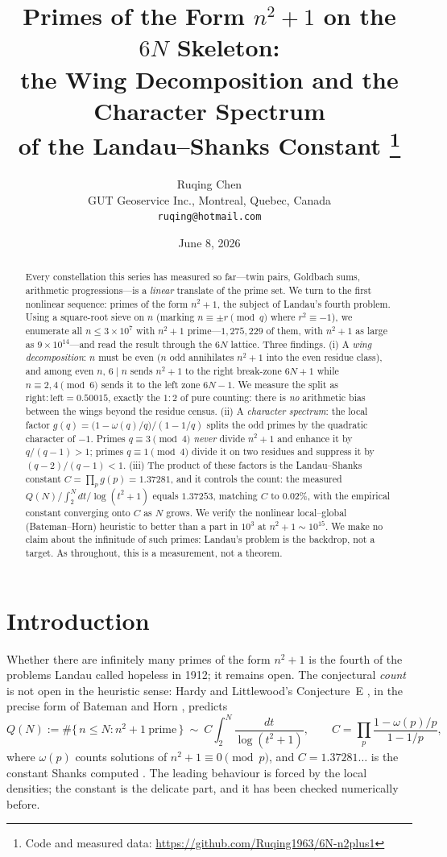 \documentclass[11pt]{article}
\title{\bf Primes of the Form $n^2+1$ on the $6N$ Skeleton:\\
the Wing Decomposition and the Character Spectrum\\
of the Landau--Shanks Constant%
\thanks{Code and measured data: \url{https://github.com/Ruqing1963/6N-n2plus1}}}
\author{Ruqing Chen\\
\small GUT Geoservice Inc., Montreal, Quebec, Canada\\
\small \texttt{ruqing@hotmail.com}}
\date{June 8, 2026}
\theoremstyle{definition}
\begin{document}
\maketitle

\begin{abstract}
Every constellation this series has measured so far---twin pairs, Goldbach sums, arithmetic
progressions---is a \emph{linear} translate of the prime set. We turn to the first nonlinear
sequence: primes of the form $n^2+1$, the subject of Landau's fourth problem. Using a square-root
sieve on $n$ (marking $n\equiv\pm r\pmod q$ where $r^2\equiv-1$), we enumerate all $n\le3\times10^{7}$
with $n^2+1$ prime---$1{,}275{,}229$ of them, with $n^2+1$ as large as $9\times10^{14}$---and read
the result through the $6N$ lattice. Three findings. (i) A \emph{wing decomposition}: $n$ must be even
($n$ odd annihilates $n^2+1$ into the even residue class), and among even $n$, $6\mid n$ sends $n^2+1$
to the right break-zone $6N{+}1$ while $n\equiv2,4\pmod6$ sends it to the left zone $6N{-}1$. We measure
the split as $\mathrm{right}:\mathrm{left}=0.50015$, exactly the $1{:}2$ of pure counting: there is
\emph{no} arithmetic bias between the wings beyond the residue census. (ii) A \emph{character
spectrum}: the local factor $g(q)=\bigl(1-\omega(q)/q\bigr)/(1-1/q)$ splits the odd primes by the
quadratic character of $-1$. Primes $q\equiv3\pmod4$ \emph{never} divide $n^2+1$ and enhance it by
$q/(q-1)>1$; primes $q\equiv1\pmod4$ divide it on two residues and suppress it by $(q-2)/(q-1)<1$. (iii)
The product of these factors is the Landau--Shanks constant $C=\prod_p g(p)=1.37281$, and it controls
the count: the measured $Q(N)/\!\int_2^N\!dt/\log(t^2{+}1)$ equals $1.37253$, matching $C$ to
$0.02\%$, with the empirical constant converging onto $C$ as $N$ grows. We verify the nonlinear
local--global (Bateman--Horn) heuristic to better than a part in $10^{3}$ at $n^2+1\sim10^{15}$. We make
no claim about the infinitude of such primes: Landau's problem is the backdrop, not a target. As
throughout, this is a measurement, not a theorem.
\end{abstract}

\section{Introduction}
Whether there are infinitely many primes of the form $n^2+1$ is the fourth of the problems Landau
called hopeless in 1912; it remains open. The conjectural \emph{count} is not open in the heuristic
sense: Hardy and Littlewood's Conjecture~E \cite{HL}, in the precise form of Bateman and Horn
\cite{BH}, predicts
\[
Q(N):=\#\{\,n\le N : n^2+1\ \text{prime}\,\}\ \sim\ C\int_2^N\frac{dt}{\log(t^2+1)},
\qquad C=\prod_p\frac{1-\omega(p)/p}{1-1/p},
\]
where $\omega(p)$ counts solutions of $n^2+1\equiv0\pmod p$, and $C=1.37281\ldots$ is the
constant Shanks computed \cite{Shanks}. The leading behaviour is forced by the local densities; the
constant is the delicate part, and it has been checked numerically before.
\end{document}
